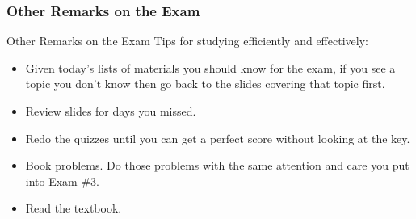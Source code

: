 \documentclass[cal1spr16Lectures.tex]{subfiles}
\begin{document}
\subsubsection{Other Remarks on the Exam}

\begin{frame}{\small Other Remarks on the Exam}\footnotesize
Tips for studying efficiently and effectively:
\begin{itemize}
\item Given today's lists of materials you should know for the exam, if you see a topic you don't know then go back to the slides covering that topic first.
\item Review slides for days you missed.
\item Redo the quizzes until you can get a perfect score without looking at the key.
\item Book problems.  Do those problems with the same attention and care you put into Exam \#3.  
\item Read the textbook.
\end{itemize}	
\end{frame}
\end{document}
